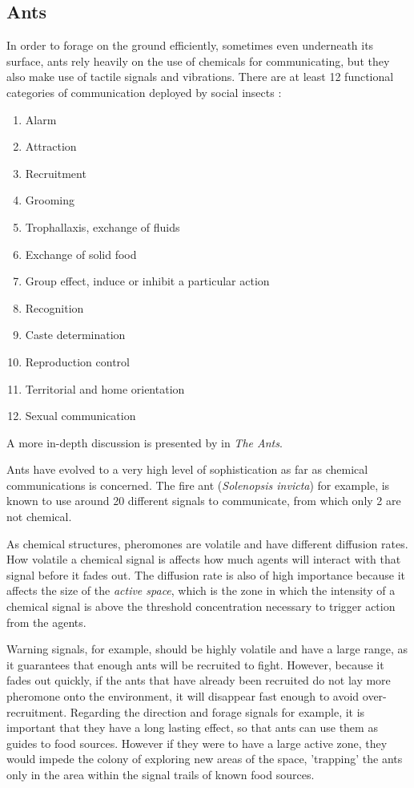\subsection{Ants}
\label{sec:com-ants}

In order to forage on the ground efficiently, sometimes even underneath its surface, ants rely heavily on the use of chemicals for communicating, but they also make use of tactile signals and vibrations. \cite{holldobler1999} There are at least 12 functional categories of communication deployed by social insects \cite{citeulike:3731267}:

\begin{enumerate}
  \item Alarm
  \item Attraction
  \item Recruitment
  \item Grooming
  \item Trophallaxis, exchange of fluids
  \item Exchange of solid food
  \item Group effect, induce or inhibit a particular action
  \item Recognition
  \item Caste determination
  \item Reproduction control
  \item Territorial and home orientation
  \item Sexual communication
\end{enumerate}

A more in-depth discussion is presented by \citeauthor{holldobler1990} in \emph{The Ants}.

Ants have evolved to a very high level of sophistication as far as chemical communications is concerned. The fire ant (\emph{Solenopsis invicta}) for example, is known to use around 20 different signals to communicate, from which only 2 are not chemical. \cite{citeulike:3731267} \cite{tschinkel2006fire}

As chemical structures, pheromones are volatile and have different diffusion rates. How volatile a chemical signal is affects how much agents will interact with that signal before it fades out. The diffusion rate is also of high importance because it affects the size of the \emph{active space}, which is the zone in which the intensity of a chemical signal is above the threshold concentration necessary to trigger action from the agents. \cite{citeulike:3731267} 

Warning signals, for example, should be highly volatile and have a large range, as it guarantees that enough ants will be recruited to fight. However, because it fades out quickly, if the ants that have already been recruited do not lay more pheromone onto the environment, it will disappear fast enough to avoid over-recruitment. Regarding the direction and forage signals for example, it is important that they have a long lasting effect, so that ants can use them as guides to food sources. However if they were to have a large active zone, they would impede the colony of exploring new areas of the space, 'trapping' the ants only in the area within the signal trails of known food sources.

